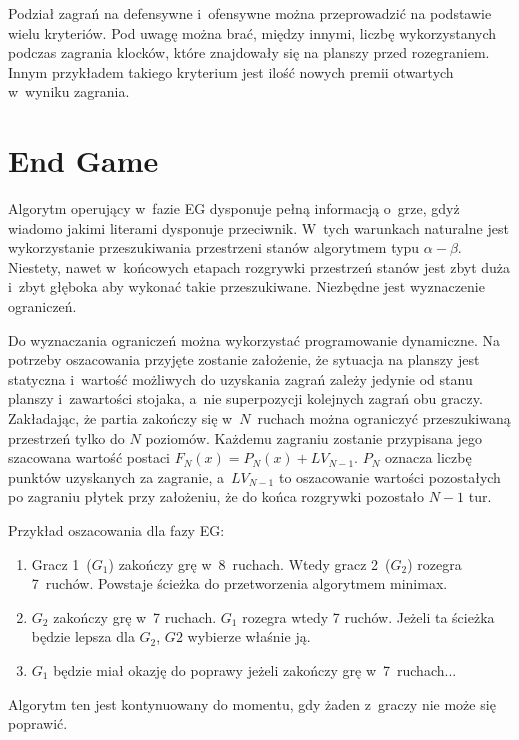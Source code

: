 \documentclass[a4paper,twocolumn,12pt]{article}
\theoremstyle{definition}
\begin{document}
Podział zagrań na defensywne i~ofensywne można przeprowadzić na podstawie wielu kryteriów. Pod uwagę można brać, między innymi, liczbę wykorzystanych podczas zagrania klocków, które znajdowały się na planszy przed rozegraniem. Innym przykładem takiego kryterium jest ilość nowych premii otwartych w~wyniku zagrania.

\section*{End Game}

Algorytm operujący w~fazie EG dysponuje pełną informacją o~grze, gdyż wiadomo jakimi literami dysponuje przeciwnik. W~tych warunkach naturalne jest wykorzystanie przeszukiwania przestrzeni stanów algorytmem typu $\alpha - \beta$. Niestety, nawet w~końcowych etapach rozgrywki przestrzeń stanów jest zbyt duża i~zbyt głęboka aby wykonać takie przeszukiwane. Niezbędne jest wyznaczenie ograniczeń.

Do wyznaczania ograniczeń można wykorzystać programowanie dynamiczne. Na potrzeby oszacowania przyjęte zostanie założenie, że sytuacja na planszy jest statyczna i~wartość możliwych do uzyskania zagrań zależy jedynie od stanu planszy i~zawartości stojaka, a~nie superpozycji kolejnych zagrań obu graczy. Zakładając, że partia zakończy się w~$N$~ruchach można ograniczyć przeszukiwaną przestrzeń tylko do $N$ poziomów. Każdemu zagraniu zostanie przypisana jego szacowana wartość postaci $F_{N}(x) = P_{N}(x) + LV_{N-1}$. $P_{N}$ oznacza liczbę punktów uzyskanych za zagranie, a~$LV_{N-1}$ to oszacowanie wartości pozostałych po zagraniu płytek przy założeniu, że do końca rozgrywki pozostało $N - 1$ tur.

Przykład oszacowania dla fazy EG:

\begin{enumerate}
	\item Gracz 1~($G_{1}$) zakończy grę w~8~ruchach. Wtedy gracz 2~($G_{2}$) rozegra 7~ruchów. Powstaje ścieżka do przetworzenia algorytmem minimax.
	\item $G_{2}$ zakończy grę w~7 ruchach. $G_{1}$ rozegra wtedy 7 ruchów. Jeżeli ta ścieżka będzie lepsza dla $G_{2}$, $G{2}$ wybierze właśnie ją.
	\item $G_{1}$ będzie miał okazję do poprawy jeżeli zakończy grę w~7~ruchach...
\end{enumerate}

Algorytm ten jest kontynuowany do momentu, gdy żaden z~graczy nie może się poprawić.
\end{document}
